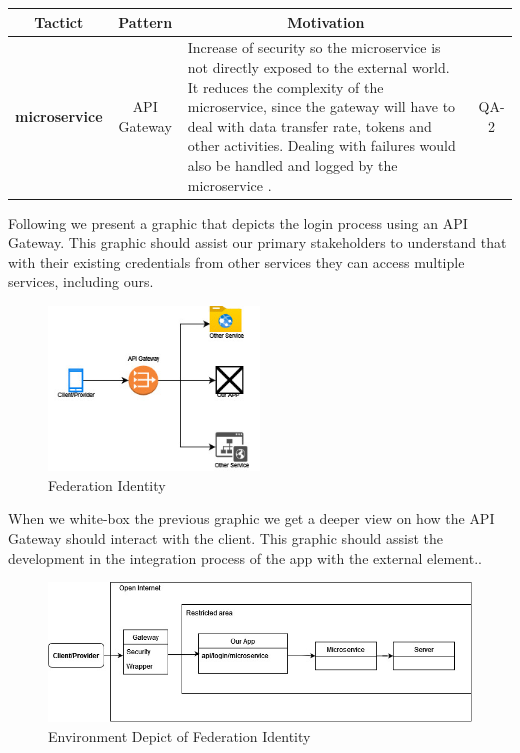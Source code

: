 \begin{table}[H]
    \begin{tabularx}{\textwidth}{|c|c|X|c|}
        \toprule
        \multicolumn{1}{c}{Tactict} & \multicolumn{1}{c}{Pattern} & \multicolumn{1}{c}{Motivation} \\
        \midrule
        \textbf{\Gls{microservice}} & \gls{API Gateway} & Increase of security so the microservice is not directly
        exposed to the external world. It reduces the complexity of the microservice, since the gateway will have to deal
        with data transfer rate, tokens and other activities. Dealing with failures would also be handled and logged
        by the microservice \cite{refonline:javtop}. & QA-2\\
        \bottomrule
    \end{tabularx}
\end{table}

Following we present a graphic that depicts the login process using an \gls{API Gateway}. This graphic should assist
our primary stakeholders to understand that with their existing credentials from other services they can access multiple 
services, including ours.

\begin{figure}[H]
    \centering
    \includegraphics[width=0.5\textwidth]{assets/simple_api_gateway.jpg}
    \caption{Federation Identity}
    \label{fig:simple_api_gateway}
\end{figure}

When we white-box the previous graphic we get a deeper view on how the \gls{API Gateway} should interact with the 
\gls{client}. This graphic should assist the development in the integration process of the app with the external element..

\begin{figure}[H]
    \centering
    \includegraphics[width=1\textwidth]{assets/complex_api_gateway.jpg}
    \caption{Environment Depict of Federation Identity}
    \label{fig:complex_api_gateway}
\end{figure}


